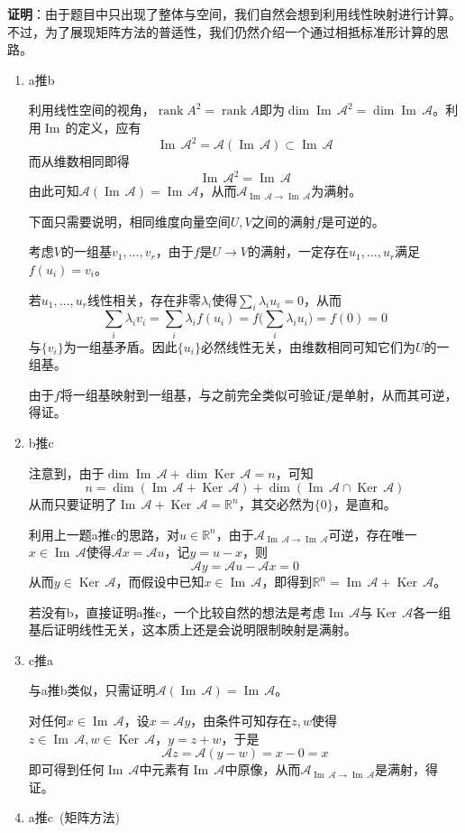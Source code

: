 \documentclass[a4paper,UTF8,fontset=windows]{ctexart}
\DeclareMathOperator{\rank}{rank}
\DeclareMathOperator{\im}{Im\,}
\DeclareMathOperator{\Ker}{Ker\,}
\newcommand*{\ma}{\mathcal{A}}
\newcommand*{\note}{\noindent *}
\begin{document}
\textbf{证明}：由于题目中只出现了整体与空间，我们自然会想到利用线性映射进行计算。不过，为了展现矩阵方法的普适性，我们仍然介绍一个通过相抵标准形计算的思路。
\begin{enumerate}
    \item a推b
    
    利用线性空间的视角，$\rank A^2=\rank A$即为$\dim\im\ma^2=\dim\im\ma$。利用$\im$的定义，应有
    $$\im\ma^2=\ma(\im\ma)\subset\im\ma$$
    而从维数相同即得
    $$\im\ma^2=\im\ma$$
    由此可知$\ma(\im\ma)=\im\ma$，从而$\ma_{\im\ma\to\im\ma}$为满射。

    下面只需要说明，相同维度向量空间$U,V$之间的满射$f$是可逆的。

    考虑$V$的一组基$v_1,\dots,v_r$，由于$f$是$U\to V$的满射，一定存在$u_1,\dots,u_r$满足$f(u_i)=v_i$。

    若$u_1,\dots,u_r$线性相关，存在非零$\lambda_i$使得$\sum_i\lambda_iu_i=0$，从而
    $$\sum_i\lambda_iv_i=\sum_i\lambda_if(u_i)=f\bigg(\sum_i\lambda_iu_i\bigg)=f(0)=0$$
    与$\{v_i\}$为一组基矛盾。因此$\{u_i\}$必然线性无关，由维数相同可知它们为$U$的一组基。

    由于$f$将一组基映射到一组基，与之前完全类似可验证$f$是单射，从而其可逆，得证。

    \item b推c
    
    注意到，由于$\dim\im\ma+\dim\Ker\ma=n$，可知
    $$n=\dim(\im\ma+\Ker\ma)+\dim(\im\ma\cap\Ker\ma)$$
    从而只要证明了$\im\ma+\Ker\ma=\mathbb{R}^n$，其交必然为$\{0\}$，是直和。

    利用上一题a推c的思路，对$u\in\mathbb{R}^n$，由于$\ma_{\im\ma\to\im\ma}$可逆，存在唯一$x\in\im\ma$使得$\ma x=\ma u$，记$y=u-x$，则
    $$\ma y=\ma u-\ma x=0$$
    从而$y\in\Ker\ma$，而假设中已知$x\in\im\ma$，即得到$\mathbb{R}^n=\im\ma+\Ker\ma$。

    \note 若没有b，直接证明a推c，一个比较自然的想法是考虑$\im\ma$与$\Ker\ma$各一组基后证明线性无关，这本质上还是会说明限制映射是满射。
    
    \item c推a
    
    与a推b类似，只需证明$\ma(\im\ma)=\im\ma$。

    对任何$x\in\im\ma$，设$x=\ma y$，由条件可知存在$z,w$使得$z\in\im\ma,w\in\Ker\ma$，$y=z+w$，于是
    $$\ma z=\ma(y-w)=x-0=x$$
    即可得到任何$\im\ma$中元素有$\im\ma$中原像，从而$\ma_{\im\ma\to\im\ma}$是满射，得证。
    
    \item a推c\ (矩阵方法)
    

\end{enumerate}
\end{document}
